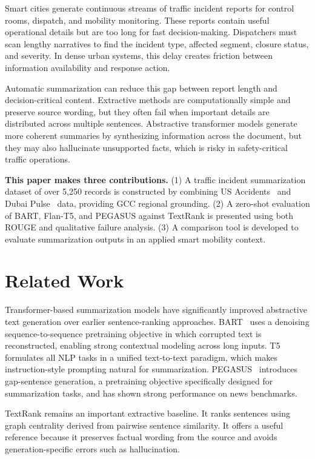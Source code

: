 \documentclass[10pt,conference]{IEEEtran}
\begin{document}
Smart cities generate continuous streams of traffic incident reports for
control rooms, dispatch, and mobility monitoring. These reports contain useful
operational details but are too long for fast decision-making. Dispatchers
must scan lengthy narratives to find the incident type, affected segment,
closure status, and severity. In dense urban systems, this
delay creates friction between information availability and response action.

Automatic summarization can reduce this gap between report length and
decision-critical content. Extractive methods are computationally simple
and preserve source wording, but they often fail when important details
are distributed across multiple sentences. Abstractive transformer models
generate more coherent summaries by synthesizing information across the
document, but they may also hallucinate unsupported facts, which is risky
in safety-critical traffic operations.

\textbf{This paper makes three contributions.}
(1) A traffic incident summarization dataset of over 5,250 records is
constructed by combining US Accidents~\cite{moosavi2023} and Dubai
Pulse~\cite{dubaipulse2023} data, providing GCC regional grounding.
(2) A zero-shot evaluation of BART, Flan-T5, and PEGASUS against
TextRank is presented using both ROUGE and
qualitative failure analysis. (3) A comparison tool is developed to
evaluate summarization outputs in an applied smart mobility context.

\section{Related Work}
\vspace{-1.5mm}

Transformer-based summarization models have significantly improved
abstractive text generation over earlier sentence-ranking approaches.
BART~\cite{lewis2020} uses a denoising sequence-to-sequence pretraining
objective in which corrupted text is reconstructed, enabling strong
contextual modeling across long inputs. T5~\cite{raffel2020} formulates
all NLP tasks in a unified text-to-text paradigm, which makes
instruction-style prompting natural for summarization. PEGASUS~\cite{zhang2020}
introduces gap-sentence generation, a pretraining objective specifically
designed for summarization tasks, and has shown strong performance on
news benchmarks.

TextRank remains an important extractive baseline.
It ranks sentences using graph centrality derived from pairwise sentence
similarity. It offers a useful reference because it preserves factual wording from the source and avoids generation-specific errors such as hallucination.
\end{document}
